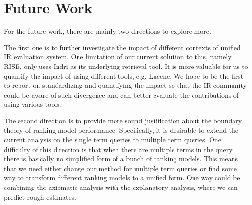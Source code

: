 %
%
\chapter{Future Work}

For the future work, there are mainly two directions to explore more. 

The first one is to further investigate the impact of different contexts 
of unified IR evaluation system. One limitation of our current solution 
to this, namely RISE, only uses Indri as its underlying retrieval tool. 
It is more valuable for us to quantify the impact of using different 
tools, e.g. Lucene. 
We hope to be the first to report on standardizing and quantifying the 
impact so that the IR community could be aware of such divergence and can 
better evaluate the contributions of using various tools. 

The second direction is to provide more sound justification about the 
boundary theory of ranking model performance. Specifically, 
it is desirable to extend the current analysis on the 
single term queries to multiple term queries. One difficulty of this 
direction is that when there are multiple terms in the query there 
is basically no simplified form of a bunch of ranking models. 
This means that we need either change our method for multiple term 
queries or find some way to transform different ranking models to 
a unified form.
One way could be combining the axiomatic analysis with the 
explanatory analysis, where we can predict rough estimates.